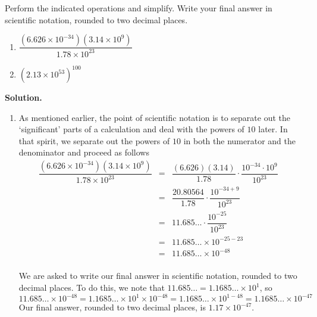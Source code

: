 \begin{ex} \label{scientificnotationex} Perform the indicated operations and simplify.  Write your final answer in scientific notation, rounded to two decimal places.

\begin{multicols}{2}

\begin{enumerate}

\item  $\dfrac{\left(6.626 \times 10^{-34} \right) \left(3.14 \times 10^{9}\right)}{1.78 \times 10^{23}}$

\item  $\left(2.13 \times 10^{53}\right)^{100}$

\end{enumerate}

\end{multicols}

{\bf Solution.}

\begin{enumerate}

\item  As mentioned earlier, the point of scientific notation is to separate out the `significant' parts of a calculation and deal with the powers of $10$ later.  In that spirit, we separate out the powers of $10$ in both the numerator and the denominator and proceed as follows \[ \begin{array}{rclr}

\dfrac{\left(6.626 \times 10^{-34} \right) \left(3.14 \times 10^{9}\right)}{1.78 \times 10^{23}} & = & \dfrac{(6.626)(3.14)}{1.78} \cdot \dfrac{10^{-34} \cdot 10^{9}}{10^{23}} & \\[8pt]
& = & \dfrac{20.80564}{1.78} \cdot \dfrac{10^{-34 + 9}}{10^{23}} & \\ [8pt]
& = & 11.685 \ldots \cdot \dfrac{10^{-25}}{10^{23}} & \\ [8pt]
& = & 11.685 \ldots \times 10^{-25-23} & \\
& = & 11.685 \ldots \times 10^{-48} & \\
\end{array} \]

We are asked to write our final answer in scientific notation, rounded to two decimal places.  To do this, we note that  $11.685 \ldots = 1.1685 \ldots \times 10^{1}$, so\[ 11.685 \ldots \times 10^{-48} = 1.1685 \ldots \times 10^{1} \times 10^{-48} = 1.1685 \ldots \times 10^{1-48} = 1.1685 \ldots \times 10^{-47} \] Our final answer, rounded to two decimal places, is $1.17 \times 10^{-47}$.  


\end{enumerate}
\end{ex}
